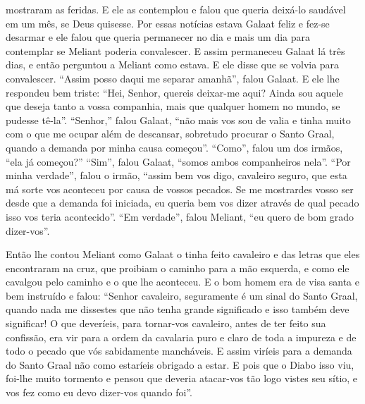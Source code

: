 mostraram as feridas. E ele as contemplou e falou que queria deixá-lo saudável
em um mês, se Deus quisesse. Por essas notícias estava Galaat feliz e fez-se
desarmar e ele falou que queria permanecer no dia e mais um dia para contemplar
se Meliant poderia convalescer. E assim permaneceu Galaat lá três dias, e então
perguntou a Meliant como estava. E ele disse que se volvia para convalescer.
“Assim posso daqui me separar amanhã”, falou Galaat. E ele lhe respondeu bem
triste: “Hei, Senhor, quereis deixar-me aqui? Ainda sou aquele que deseja tanto
a vossa companhia, mais que qualquer homem no mundo, se pudesse tê-la”.
“Senhor,” falou Galaat, “não mais vos sou de valia e tinha muito com o que me
ocupar além de descansar, sobretudo procurar o Santo Graal, quando a demanda
por minha causa começou”. “Como”, falou um dos irmãos, “ela já começou?”
“Sim”, falou Galaat, “somos ambos companheiros nela”. “Por minha verdade”,
falou o irmão, “assim bem vos digo, cavaleiro seguro, que esta má sorte vos
aconteceu por causa de vossos pecados. Se me mostrardes vosso ser desde que a
demanda foi iniciada, eu queria bem vos dizer através de qual pecado isso vos
teria acontecido”. “Em verdade”, falou Meliant, “eu quero de bom grado
dizer-vos”. 

Então lhe contou Meliant como Galaat o tinha feito cavaleiro e das letras que
eles encontraram na cruz, que proibiam o caminho para a mão esquerda, e como
ele cavalgou pelo caminho e o que lhe aconteceu. E o bom homem era de visa
santa e bem instruído e falou: “Senhor cavaleiro, seguramente é um sinal do
Santo Graal, quando nada me dissestes que não tenha grande significado e isso
também deve significar! O que deveríeis, para tornar-vos cavaleiro, antes de
ter feito sua confissão, era vir para a ordem da cavalaria puro e claro de toda
a impureza e de todo o pecado que vós sabidamente mancháveis. E assim viríeis
para a demanda do Santo Graal não como estaríeis obrigado a estar. E pois que o
Diabo isso viu, foi-lhe muito tormento e pensou que deveria atacar-vos tão logo
vistes seu sítio, e vos fez como eu devo dizer-vos quando foi''.

